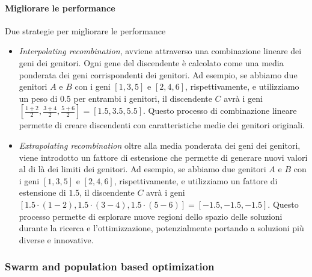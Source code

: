 \paragraph{Migliorare le performance} Due strategie per migliorare le performance
\begin{itemize}
    \item \textit{Interpolating recombination}, avviene attraverso una combinazione lineare dei geni dei genitori. Ogni gene del discendente è calcolato come una media ponderata dei geni corrispondenti dei genitori. Ad esempio, se abbiamo due genitori $A$ e $B$ con i geni $[1, 3, 5]$ e $[2, 4, 6]$, rispettivamente, e utilizziamo un peso di $0.5$ per entrambi i genitori, il discendente $C$ avrà i geni $[\frac{1+2}{2}, \frac{3+4}{2}, \frac{5+6}{2}] = [1.5, 3.5, 5.5]$. Questo processo di combinazione lineare permette di creare discendenti con caratteristiche medie dei genitori originali.
    \item \textit{Extrapolating recombination} oltre alla media ponderata dei geni dei genitori, viene introdotto un fattore di estensione che permette di generare nuovi valori al di là dei limiti dei genitori. Ad esempio, se abbiamo due genitori $A$ e $B$ con i geni $[1, 3, 5]$ e $[2, 4, 6]$, rispettivamente, e utilizziamo un fattore di estensione di $1.5$, il discendente $C$ avrà i geni $[1.5\cdot(1-2), 1.5\cdot(3-4), 1.5\cdot(5-6)] = [-1.5, -1.5, -1.5]$. Questo processo permette di esplorare nuove regioni dello spazio delle soluzioni durante la ricerca e l'ottimizzazione, potenzialmente portando a soluzioni più diverse e innovative.
\end{itemize}

\subsubsection{Swarm and population based optimization}

